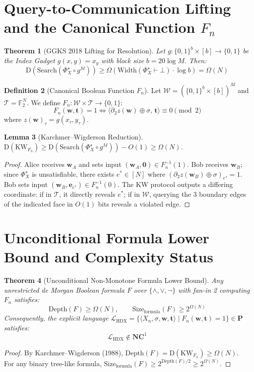 \documentclass[11pt,a4paper]{article}
\newtheorem{theorem}{Theorem}[section]
\newtheorem{lemma}[theorem]{Lemma}
\theoremstyle{definition}
\newtheorem{definition}[theorem]{Definition}
\newcommand{\KW}{\mathrm{KW}}
\newcommand{\Width}{\mathrm{Width}}
\newcommand{\Size}{\mathrm{Size}}
\newcommand{\Depth}{\mathrm{Depth}}
\begin{document}
\section{Query-to-Communication Lifting and the Canonical Function $F_n$}
\begin{theorem}[GGKS 2018 Lifting for Resolution]\label{thm:ggks}
Let $g: \{0, 1\}^b \times [b] \to \{0, 1\}$ be the Index Gadget $g(x, y) = x_y$ with block size $b = 20 \log M$. Then:
$$\mathrm{D}(\mathrm{Search}(\Phi_X^\star \circ g^M)) \ge \Omega(\Width(\Phi_X^\star \vdash \bot) \cdot \log b) = \Omega(N)$$
\end{theorem}

\begin{definition}[Canonical Boolean Function $F_n$]
Let $\mathcal{W} = (\{0, 1\}^b \times [b])^M$ and $\mathcal{T} = \mathbb{F}_2^N$. We define $F_n: \mathcal{W} \times \mathcal{T} \to \{0, 1\}$:
$$F_n(\mathbf{w}, \mathbf{t}) = 1 \iff \langle \partial_2 z(\mathbf{w}) \oplus \sigma, \, \mathbf{t} \rangle \equiv 0 \pmod 2$$
where $z(\mathbf{w})_\tau = g(x_\tau, y_\tau)$.
\end{definition}

\begin{lemma}[Karchmer--Wigderson Reduction]\label{lem:kw}
$\mathrm{D}(\KW_{F_n}) \ge \mathrm{D}(\mathrm{Search}(\Phi_X^\star \circ g^M)) - O(1) \ge \Omega(N)$.
\end{lemma}
\begin{proof}
Alice receives $\mathbf{w}_A$ and sets input $(\mathbf{w}_A, \mathbf{0}) \in F_n^{-1}(1)$.
Bob receives $\mathbf{w}_B$; since $\Phi_X^\star$ is unsatisfiable, there exists $e^* \in [N]$ where $(\partial_2 z(\mathbf{w}_B) \oplus \sigma)_{e^*} = 1$. Bob sets input $(\mathbf{w}_B, \mathbf{e}_{e^*}) \in F_n^{-1}(0)$.
The KW protocol outputs a differing coordinate:
if in $\mathcal{T}$, it directly reveals $e^*$; if in $\mathcal{W}$, querying the 3 boundary edges of the indicated face in $O(1)$ bits reveals a violated edge.
\end{proof}

\section{Unconditional Formula Lower Bound and Complexity Status}

\begin{theorem}[Unconditional Non-Monotone Formula Lower Bound]
Any unrestricted de Morgan Boolean formula $F$ over $\{\wedge, \vee, \neg\}$ with fan-in 2 computing $F_n$ satisfies:
$$\Depth(F) \ge \Omega(N), \qquad \Size_{\mathrm{formula}}(F) \ge 2^{\Omega(N)}$$
Consequently, the explicit language $\mathcal{L}_{\mathrm{HDX}} = \{ \langle X_n, \sigma, \mathbf{w}, \mathbf{t} \rangle \mid F_n(\mathbf{w}, \mathbf{t}) = 1 \} \in \mathbf{P}$ satisfies:
$$\mathcal{L}_{\mathrm{HDX}} \notin \mathbf{NC}^1$$
\end{theorem}
\begin{proof}
By Karchmer--Wigderson (1988), $\Depth(F) = \mathrm{D}(\KW_{F_n}) \ge \Omega(N)$. For any binary tree-like formula, $\Size_{\mathrm{formula}}(F) \ge 2^{\Depth(F)/2} \ge 2^{\Omega(N)}$.
\end{proof}
\end{document}
